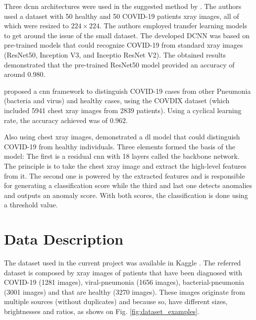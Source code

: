 \documentclass[conference]{IEEEtran}
\begin{document}
Three \gls{dcnn} architectures were used in the suggested method by \cite{narin2021automatic}. The authors used a dataset with 50 healthy and 50 COVID-19 patients \gls{xray} images, all of which were resized to $224 \times 224$. The authors employed transfer learning models to get around the issue of the small dataset. The developed DCNN was based on pre-trained models that could recognize COVID-19 from standard \gls{xray} images (ResNet50, Inception V3, and Inceptio ResNet V2). The obtained results demonstrated that the pre-trained ResNet50 model provided an accuracy of around 0.980.

\cite{farooq2020covid} proposed a \gls{cnn} framework to distinguish COVID-19 cases from other Pneumonia (bacteria and virus) and healthy cases, using the COVDIX dataset \cite{wang2020covid} (which included 5941 chest \gls{xray} images from 2839 patients). Using a cyclical learning rate, the accuracy achieved was of 0.962.

Also using chest \gls{xray} images, \cite{zhang2020covid} demonstrated a \gls{dl} model that could distinguish COVID-19 from healthy individuals. Three elements formed the basis of the model: The first is a residual \gls{cnn} with 18 layers called the backbone network. The principle is to take the chest \gls{xray} image and extract the high-level features from it. The second one is powered by the extracted features and is responsible for generating a classification score while the third and last one detects anomalies and outputs an anomaly score. With both scores, the classification is done using a threshold value.

\section{Data Description}

The dataset used in the current project was available in Kaggle \cite{kolas_2022}. The referred dataset is composed by \gls{xray} images of patients that have been diagnosed with COVID-19 (1281 images), viral-pneumonia (1656 images), bacterial-pneumonia (3001 images) and that are healthy (3270 images). These images originate from multiple sources (without duplicates) and because so, have different sizes, brightnesses and ratios, as shows on Fig. \ref{fig:dataset_examples}.
\end{document}
